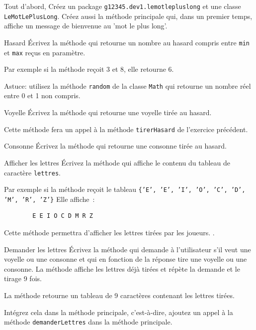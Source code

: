 \documentclass[a4paper,11pt]{style-esi/td}
\begin{document}
	Tout d'abord,
	Créez un package \texttt{g12345.dev1.lemotlepluslong} et une classe
	\texttt{LeMot\-Le\-Plus\-Long}. 
	Créez aussi la méthode principale qui, dans un premier temps, 
	affiche un message de bienvenue au 'mot le plus long'.


 	\begin{Exercice}{Hasard}
		\'Ecrivez la méthode  qui
		retourne un nombre au hasard compris entre \texttt{min} et
		\texttt{max} reçus en paramètre.
		
		Par exemple si la méthode reçoit 3 et 8, elle retourne 6.
		
		Astuce: utilisez la méthode \texttt{random} de la classe \texttt{Math} qui 
		retourne un nombre réel entre 0 et 1 non compris.
	\end{Exercice} 

 
 	\begin{Exercice}{Voyelle}
		\'Ecrivez la méthode  qui retourne une voyelle 
		tirée au hasard.
		
		Cette méthode fera un appel à la méthode \texttt{tirerHasard} 
		de l'exercice précédent.
	\end{Exercice} 

 	\begin{Exercice}{Consonne}
		\'Ecrivez la méthode  qui retourne une consonne 
		tirée au hasard.
	\end{Exercice} 

 	\begin{Exercice}{Afficher les lettres}
 		\'Ecrivez la méthode 
		qui affiche le contenu du tableau de caractère \texttt{lettres}.
		
		Par exemple si la méthode reçoit le tableau 
		\texttt{\{'E', 'E', 'I', 'O', 'C', 'D', 'M', 'R', 'Z'\}}
		Elle affiche~:
		
		\begin{verbatim}
		E E I O C D M R Z
		\end{verbatim}
		
		Cette méthode permettra d'afficher les lettres tirées par les joueurs.
.
	\end{Exercice} 

 	\begin{Exercice}{Demander les lettres}
		\'Ecrivez la méthode 
		qui demande à l'utilisateur s'il veut une voyelle ou une consonne
		et qui en fonction de la réponse tire une voyelle ou une consonne.
		La méthode affiche les lettres déjà tirées et répète la demande
		et le tirage 9 fois.
		 
		La méthode retourne un tableau de 9 caractères contenant les lettres tirées. 
		
		Intégrez cela dans la méthode principale, c'est-à-dire, ajoutez un appel à 
		la méthode \texttt{demanderLettres} dans la méthode principale.
	\end{Exercice} 
\end{document}
